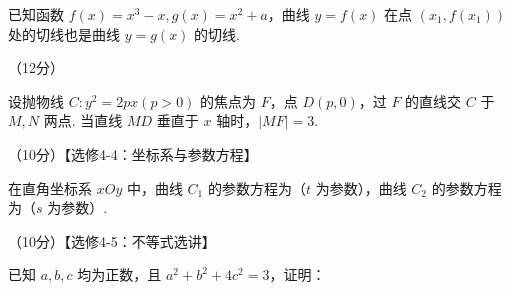 \documentclass[a4paper,11pt]{report}
\begin{document}
\begin{examanswers}[start=17]
已知函数 $f(x)=x^3-x,g(x)=x^2+a$，曲线 $y=f(x)$ 在点 $(x_1,f(x_1))$ 处的切线也是曲线 $y=g(x)$ 的切线. 


\vspace{-0.5em}
\item（12分）

设抛物线 $C:y^2=2px(p>0)$ 的焦点为 $F$，点 $D(p,0)$，过 $F$ 的直线交 $C$ 于 $M,N$ 两点. 当直线 $MD$ 垂直于 $x$ 轴时，$|MF|=3$. 


\end{examanswers}


\begin{examanswers}[start=22]
\item（10分）【选修4-4：坐标系与参数方程】

在直角坐标系 $xOy$ 中，曲线 $C_1$ 的参数方程为（$t$ 为参数），曲线 $C_2$ 的参数方程为（$s$ 为参数）. 


\vspace{-0.5em}
\item（10分）【选修4-5：不等式选讲】

已知 $a,b,c$ 均为正数，且 $a^2+b^2+4c^2=3$，证明：


\end{examanswers}
\end{document}
